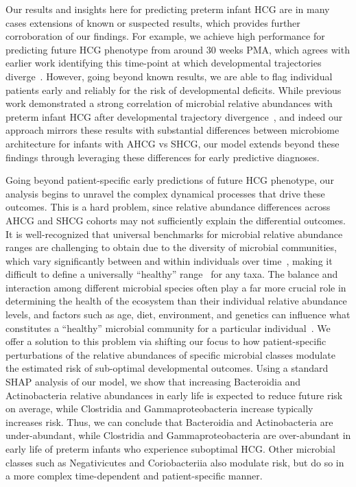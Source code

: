 \documentclass[onecolumn,10pt]{IEEEtran}
\def\bact{Bacteroidia\xspace}
\def\actn{Actinobacteria\xspace}
\def\gamm{Gammaproteobacteria\xspace}
\def\clsd{Clostridia\xspace}
\begin{document}
Our results and insights here for predicting preterm infant HCG are in many cases extensions of known or suspected results, which provides further corroboration of our findings. For example, we achieve high  performance for predicting future HCG phenotype  from around $30$ weeks PMA, which agrees with earlier work identifying this time-point  at which developmental trajectories diverge~\cite{oliphant2021bacteroidota}. However, going beyond known results, we  are able to flag individual patients early and reliably for the risk of developmental deficits. While previous work demonstrated a strong correlation of microbial relative abundances with preterm infant HCG after developmental trajectory divergence~\cite{oliphant2021bacteroidota}, and indeed our approach mirrors these results with substantial differences between microbiome architecture for infants with AHCG vs SHCG, our model extends beyond these findings through leveraging these differences for early predictive diagnoses. 

Going beyond patient-specific early predictions of  future HCG phenotype, our analysis begins to unravel the complex dynamical processes that drive these outcomes.
This is a hard problem, since relative abundance differences across AHCG and SHCG cohorts may not sufficiently explain the differential outcomes. 
It is well-recognized that  universal benchmarks for microbial relative abundance ranges are challenging to obtain due to the  diversity  of microbial communities, which vary significantly between and within individuals over time~\cite{zaura2009defining}, making it difficult to define a universally ``healthy'' range~\cite{lozupone2012diversity} for any taxa. The balance and interaction among different microbial species often play a far more crucial role in determining the health of the ecosystem than their individual relative abundance levels, and factors such as age, diet, environment, and genetics can influence what constitutes a ``healthy'' microbial community for a particular individual~\cite{yatsunenko2012human}. We offer a  solution to this problem via shifting our focus to how patient-specific perturbations of the relative abundances of specific microbial classes modulate the estimated risk of sub-optimal developmental outcomes. Using a standard  SHAP analysis of our model, we show that increasing \bact and \actn relative abundances in early life is expected to reduce future risk on average, while 
\clsd and \gamm increase typically increases risk. Thus, we can conclude that \bact and \actn are under-abundant, while \clsd and \gamm are over-abundant in early life of preterm infants who experience suboptimal HCG. Other microbial classes such as  Negativicutes and Coriobacteriia also modulate risk, but do so  in a more complex  time-dependent and patient-specific  manner. 
\end{document}
